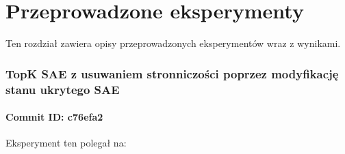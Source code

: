 \chapter{Przeprowadzone eksperymenty}
\label{chap:eksperymenty}

Ten rozdział zawiera opisy przeprowadzonych eksperymentów wraz z wynikami.

\subsection{TopK SAE z usuwaniem stronniczości poprzez modyfikację stanu ukrytego SAE}
\subsubsection{Commit ID: c76efa2}

Eksperyment ten polegał na:
